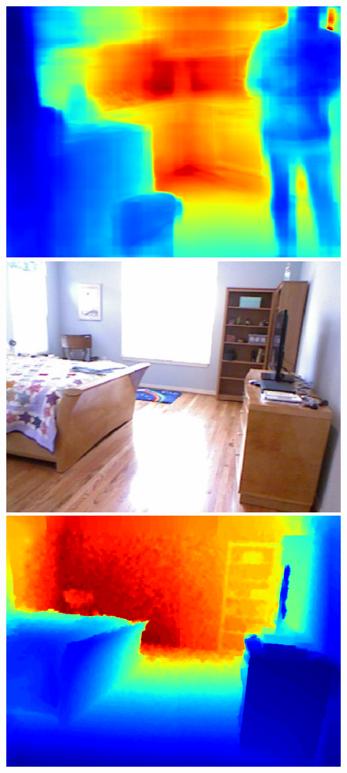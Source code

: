 \documentclass{svjour3}                     %
\begin{document}
\begin{figure}[t]
{\begin{minipage}[t]{0.15\linewidth}
  \includegraphics[width=1\linewidth]{images/nyu_without/kitchen_rgb_00566.png}
  \includegraphics[width=1\linewidth]{images/nyu_rgb/1149.png}
  \includegraphics[width=1\linewidth]{images/nyu_gt/1149.png}

\end{minipage}}
\end{figure}
\end{document}
